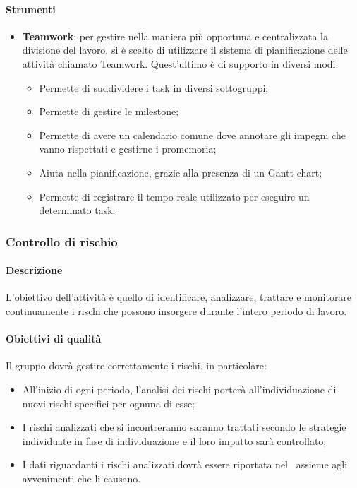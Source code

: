 \documentclass[../NormeDiProgetto_v3.0.0.tex]{subfiles}
\begin{document}
			\paragraph{Strumenti}
			\begin{itemize}
				\item \textbf{Teamwork}: per gestire nella maniera più opportuna e centralizzata la divisione del lavoro, si è scelto di utilizzare il sistema di pianificazione delle attività chiamato Teamwork.
				Quest'ultimo è di supporto in diversi modi:
				\begin{itemize}
				\item Permette di suddividere i task in diversi sottogruppi;
				\item Permette di gestire le milestone;
				\item Permette di avere un calendario comune dove annotare gli impegni che vanno rispettati e gestirne i promemoria;
				\item Aiuta nella pianificazione, grazie alla presenza di un Gantt chart;
				\item Permette di registrare il tempo reale utilizzato per eseguire un determinato task.
				\end{itemize}
			\end{itemize}

		\subsubsection{Controllo di rischio}
			\paragraph{Descrizione}
			L'obiettivo dell'attività è quello di identificare, analizzare, trattare e monitorare continuamente i rischi che possono insorgere durante l'intero periodo di lavoro.
		
			\paragraph{Obiettivi di qualità}
			Il gruppo dovrà gestire correttamente i rischi, in particolare:
			\begin{itemize}
				\item All'inizio di ogni periodo, l'analisi dei rischi porterà all'individuazione di nuovi rischi specifici per ognuna di esse;
				\item I rischi analizzati che si incontreranno saranno trattati secondo le strategie individuate in fase di individuazione e il loro impatto sarà controllato;
				\item I dati riguardanti i rischi analizzati dovrà essere riportata nel \pianodiqualifica\ assieme agli avvenimenti che li causano.
			\end{itemize}
\end{document}
